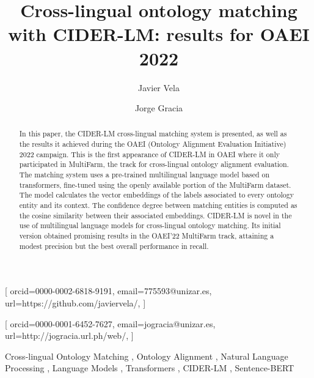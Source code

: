 \documentclass[
]{ceurart}
\begin{document}


\title{Cross-lingual ontology matching with CIDER-LM: results for OAEI 2022}

\author{Javier Vela}[%
orcid=0000-0002-6818-9191,
email=775593@unizar.es,
url=https://github.com/javiervela/,
]
\author{Jorge Gracia}[%
orcid=0000-0001-6452-7627,
email=jogracia@unizar.es,
url=http://jogracia.url.ph/web/,
]

\address{Department of Computer Science and Systems Engineering\\ University of Zaragoza \\
María de Luna 1, 50018 Zaragoza, Spain}


\begin{abstract}
In this paper, the CIDER-LM cross-lingual matching system is presented, as well as the results it achieved during the OAEI (Ontology Alignment Evaluation Initiative) 2022 campaign. This is the first appearance of CIDER-LM in OAEI where it only participated in MultiFarm, the track for cross-lingual ontology alignment evaluation. The matching system uses a pre-trained multilingual language model based on transformers, fine-tuned using the openly available portion of the MultiFarm dataset. The model calculates the vector embeddings of the labels associated to every ontology entity and its context. The confidence degree between matching entities is computed as the cosine similarity between their associated embeddings. CIDER-LM is novel in the use of multilingual language models for cross-lingual ontology matching. Its initial version obtained promising results in the OAEI'22 MultiFarm track, attaining a modest precision but the best overall performance in recall. 
\end{abstract}

\begin{keywords}
    Cross-lingual Ontology Matching \sep
    Ontology Alignment \sep
    Natural Language Processing \sep
    Language Models \sep
    Transformers \sep
    CIDER-LM \sep
    Sentence-BERT
\end{keywords}

\maketitle
\end{document}
